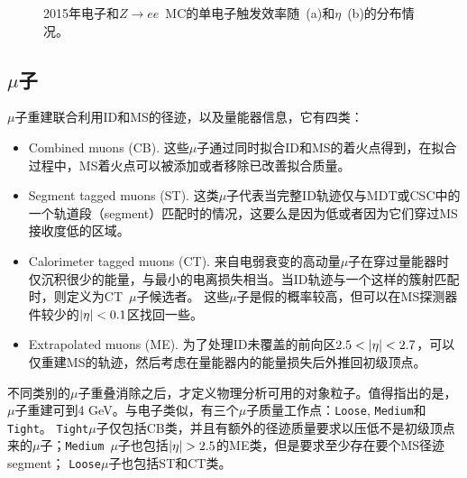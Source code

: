 \begin{figure}[h]
\begin{center}
\begin{subfigure}[b]{0.45\textwidth}
      \caption{}
      \label{fig:ele_trigger_eta_eff}
  \end{subfigure}
\caption{2015年电子和$Z\rightarrow ee$~MC的单电子触发效率随\et~(a)和$\eta$~(b)的分布情况\cite{ATLAS-CONF-2016-024}。} 
 \label{fig:ele_trigger_eff}
\end{center}
\end{figure}

\subsection{$\mu$子}
$\mu$子重建联合利用ID和MS的径迹，以及量能器信息，它有四类：
\begin{itemize}
 \item Combined muons (CB). 这些$\mu$子通过同时拟合ID和MS的着火点得到，在拟合过程中，MS着火点可以被添加或者移除已改善拟合质量。
 \item Segment tagged muons (ST). 这类$\mu$子代表当完整ID轨迹仅与MDT或CSC中的一个轨道段（segment）匹配时的情况，这要么是因为\pt 低或者因为它们穿过MS接收度低的区域。
 \item Calorimeter tagged muons (CT). 来自电弱衰变的高动量$\mu$子在穿过量能器时仅沉积很少的能量，与最小的电离损失相当。当ID轨迹与一个这样的簇射匹配时，则定义为CT~$\mu$子候选者。 
 这些$\mu$子是假的概率较高，但可以在MS探测器件较少的$|\eta|<0.1$区找回一些。
 \item Extrapolated muons (ME). 为了处理ID未覆盖的前向区$2.5<\abseta<2.7$，可以仅重建MS的轨迹，然后考虑在量能器内的能量损失后外推回初级顶点。
\end{itemize}
不同类别的$\mu$子重叠消除之后，才定义物理分析可用的对象粒子。值得指出的是，$\mu$子重建可到4 GeV。与电子类似，有三个$\mu$子质量工作点：\texttt{Loose}, \texttt{Medium}和\texttt{Tight}。
\texttt{Tight}$\mu$子仅包括CB类，并且有额外的径迹质量要求以压低不是初级顶点来的$\mu$子；\texttt{Medium}~$\mu$子也包括$\abseta>2.5$的ME类，但是要求至少存在要个MS径迹segment；
\texttt{Loose}$\mu$子也包括ST和CT类。

